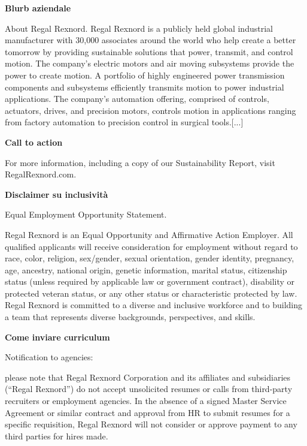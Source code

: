 \noindent\textbf{\textcolor{companyBlurbColor}{Blurb aziendale}}\par
\noindent About Regal Rexnord. Regal Rexnord is a publicly held global industrial manufacturer with 30,000 associates around the world who help create a better tomorrow by providing sustainable solutions that power, transmit, and control motion. The company's electric motors and air moving subsystems provide the power to create motion. A portfolio of highly engineered power transmission components and subsystems efficiently transmits motion to power industrial applications. The company's automation offering, comprised of controls, actuators, drives, and precision motors, controls motion in applications ranging from factory automation to precision control in surgical tools.[...]\par
\noindent{\color{companyBlurbColor}\rule{\textwidth}{0.6pt}}\par\medskip

\noindent\textbf{\textcolor{callToActionColor}{Call to action}}\par
\noindent For more information, including a copy of our Sustainability Report, visit RegalRexnord.com.\par
\noindent{\color{callToActionColor}\rule{\textwidth}{0.6pt}}\par\medskip

\noindent\textbf{\textcolor{inclusivityColor}{Disclaimer su inclusività}}\par
\noindent Equal Employment Opportunity Statement.\par\smallskip
Regal Rexnord is an Equal Opportunity and Affirmative Action Employer. All qualified applicants will receive consideration for employment without regard to race, color, religion, sex/gender, sexual orientation, gender identity, pregnancy, age, ancestry, national origin, genetic information, marital status, citizenship status (unless required by applicable law or government contract), disability or protected veteran status, or any other status or characteristic protected by law. Regal Rexnord is committed to a diverse and inclusive workforce and to building a team that represents diverse backgrounds, perspectives, and skills.\par
\noindent{\color{inclusivityColor}\rule{\textwidth}{0.6pt}}\par\medskip

\noindent\textbf{\textcolor{applicationColor}{Come inviare curriculum}}\par
\noindent Notification to agencies:\par\smallskip
please note that Regal Rexnord Corporation and its affiliates and subsidiaries (``Regal Rexnord'') do not accept unsolicited resumes or calls from third-party recruiters or employment agencies. In the absence of a signed Master Service Agreement or similar contract and approval from HR to submit resumes for a specific requisition, Regal Rexnord will not consider or approve payment to any third parties for hires made.\par
\noindent{\color{applicationColor}\rule{\textwidth}{0.6pt}}\par\medskip

